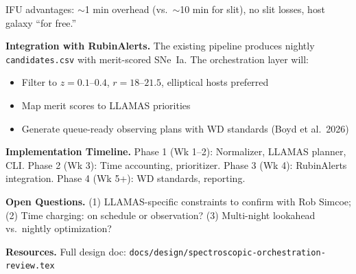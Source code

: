 \documentclass[10pt]{article}
\begin{document}
\vspace{-2pt}
IFU advantages: $\sim$1 min overhead (vs.\ $\sim$10 min for slit), no slit losses, host galaxy ``for free.''

\textbf{Integration with RubinAlerts.} The existing pipeline produces nightly \texttt{candidates.csv} with merit-scored SNe~Ia. The orchestration layer will:
\begin{itemize}[nosep, leftmargin=1.5em]
    \item Filter to $z = 0.1$--$0.4$, $r = 18$--$21.5$, elliptical hosts preferred
    \item Map merit scores to LLAMAS priorities
    \item Generate queue-ready observing plans with WD standards (Boyd et al.\ 2026)
\end{itemize}

\textbf{Implementation Timeline.}
Phase 1 (Wk 1--2): Normalizer, LLAMAS planner, CLI.
Phase 2 (Wk 3): Time accounting, prioritizer.
Phase 3 (Wk 4): RubinAlerts integration.
Phase 4 (Wk 5+): WD standards, reporting.

\textbf{Open Questions.}
(1) LLAMAS-specific constraints to confirm with Rob Simcoe;
(2) Time charging: on schedule or observation?
(3) Multi-night lookahead vs.\ nightly optimization?

\textbf{Resources.} Full design doc: \texttt{docs/design/spectroscopic-orchestration-review.tex}
\end{document}
